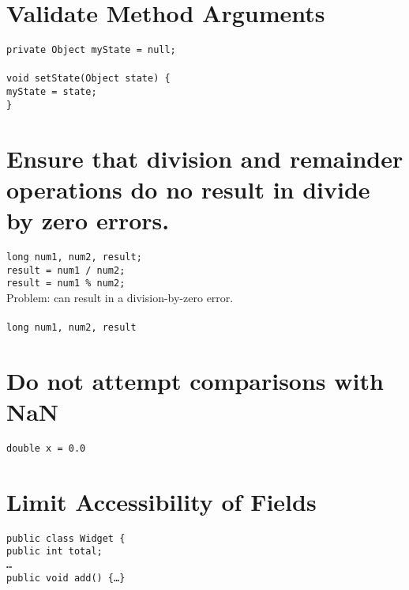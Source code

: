 \documentclass[a4paper]{article}
\begin{document}
	\section{Validate Method Arguments}
	\texttt{private Object myState = null;\\ \\void setState(Object state) \{\\myState = state;\\\}}

	\section{Ensure that division and remainder operations do no result in divide by zero errors.}
	\texttt{long num1, num2, result;\\result = num1 / num2;\\result = num1 \% num2;}\\
	Problem: can result in a division-by-zero error.\\
	\\
	\texttt{long num1, num2, result}

	\section{Do not attempt comparisons with NaN}
	\texttt{double x = 0.0}

	\section{Limit Accessibility of Fields}
	\texttt{public class Widget \{\\public int total;\\\ldots\\public void add() \{\ldots\}}
\end{document}
